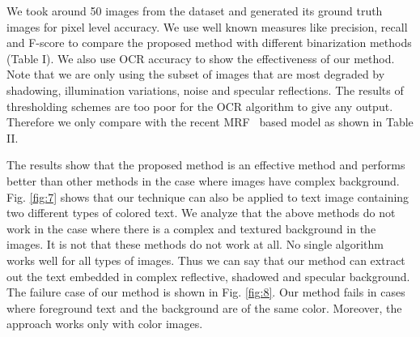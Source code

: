 We took around 50
images from the dataset and generated its ground truth images for pixel level accuracy.
We use well known measures like precision, recall and F-score to
compare the proposed method with different binarization methods (Table I).
We also use OCR accuracy to show the effectiveness of our method. Note that we are only
using the subset of images that are most degraded by shadowing, illumination variations,
noise and specular reflections. The results of thresholding schemes are too poor for the
OCR algorithm to give any output. Therefore we only compare with the recent MRF~\cite{A16}
based model as shown in Table II.


The results show that the proposed method is an effective method and performs better than other methods 
in the case where images have
complex background. Fig. \ref{fig:7} shows that our technique can also be applied to text image containing 
two different types of colored text.
We analyze that the above methods do not work in the case where there is a complex and textured background in the images.
It is not that these methods do not work at all. No single algorithm works well for all types of images. Thus we can say
that our method can extract out the text embedded in complex reflective, shadowed and
specular background.
The failure case of our method is shown in Fig. \ref{fig:8}.
Our method fails in cases where foreground text and the background are of the same color.
Moreover, the approach works only with color images.



